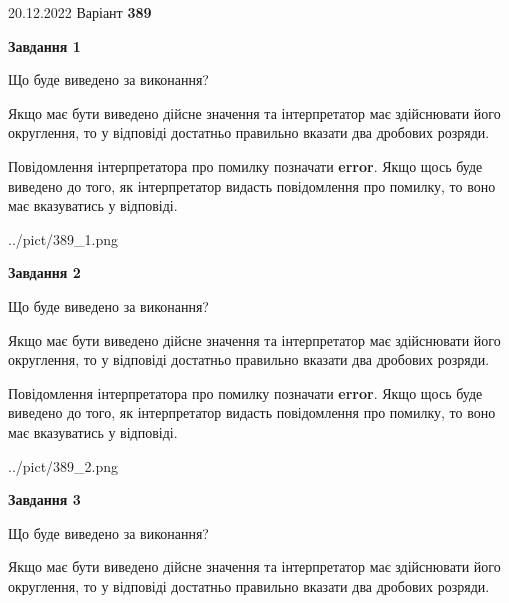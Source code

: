 \documentclass[12pt, ukrainian]{article}
\begin{document}
{20.12.2022 Варіант \No \textbf { 389 }\par}
{
\begin {Large}

{\begin {center}\textbf{Завдання 1}\end {center}}\par
Що буде виведено за виконання? \par

Якщо має бути виведено дійсне значення та інтерпретатор має здійснювати його округлення, 
то у відповіді достатньо правильно вказати два дробових розряди.

Повідомлення інтерпретатора про помилку позначати \textbf{error}.
Якщо щось буде виведено до того, як інтерпретатор видасть повідомлення про помилку, 
то воно має вказуватись у відповіді. \par

\begin{center}
	{../pict/389_1.png}
\end{center}
\newpage

{\begin {center}\textbf{Завдання 2}\end {center}}\par
Що буде виведено за виконання? \par

Якщо має бути виведено дійсне значення та інтерпретатор має здійснювати його округлення, 
то у відповіді достатньо правильно вказати два дробових розряди.

Повідомлення інтерпретатора про помилку позначати \textbf{error}.
Якщо щось буде виведено до того, як інтерпретатор видасть повідомлення про помилку, 
то воно має вказуватись у відповіді. \par

\begin{center}
	{../pict/389_2.png}
\end{center}
\newpage

{\begin {center}\textbf{Завдання 3}\end {center}}\par
Що буде виведено за виконання? \par

Якщо має бути виведено дійсне значення та інтерпретатор має здійснювати його округлення, 
то у відповіді достатньо правильно вказати два дробових розряди.


\end{Large}}
\end{document}
